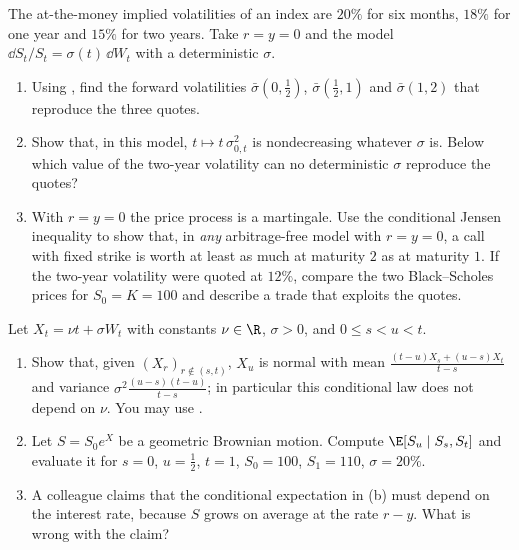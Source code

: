 
\begin{exercise}\label{ex:ps-forward-variance}
\easy The at-the-money implied volatilities of an index are $20\%$ for six months, $18\%$ for
one year and $15\%$ for two years. Take $r=y=0$ and the model
$\dd S_t/S_t=\sigma(t)\,\dd W_t$ with a deterministic $\sigma$.
\begin{enumerate}[label=(\alph*)]
  \item Using , find the forward volatilities
    $\bar\sigma(0,\frac12)$, $\bar\sigma(\frac12,1)$ and $\bar\sigma(1,2)$ that reproduce the
    three quotes.
  \item Show that, in this model, $t\mapsto t\,\sigma_{0,t}^2$ is nondecreasing whatever
    $\sigma$ is. Below which value of the two-year volatility can no deterministic $\sigma$
    reproduce the quotes?
  \item With $r=y=0$ the price process is a martingale. Use the conditional Jensen inequality
    to show that, in \emph{any} arbitrage-free model with $r=y=0$, a call with fixed strike is
    worth at least as much at maturity $2$ as at maturity $1$. If the two-year volatility were
    quoted at $12\%$, compare the two Black--Scholes prices for $S_0=K=100$ and describe a
    trade that exploits the quotes.
\end{enumerate}
\end{exercise}

\begin{exercise}\label{ex:ps-bridge-drift}
\easy Let $X_t=\nu t+\sigma W_t$ with constants $\nu\in\R$, $\sigma>0$, and $0\le s<u<t$.
\begin{enumerate}[label=(\alph*)]
  \item Show that, given $(X_r)_{r\notin(s,t)}$, $X_u$ is normal with mean
    $\frac{(t-u)X_s+(u-s)X_t}{t-s}$ and variance $\sigma^2\frac{(u-s)(t-u)}{t-s}$; in
    particular this conditional law does not depend on $\nu$. You may use
    .
  \item Let $S=S_0e^X$ be a geometric Brownian motion. Compute
    $\E[S_u\mid S_s,S_t]$ and evaluate it for $s=0$, $u=\frac12$, $t=1$, $S_0=100$,
    $S_1=110$, $\sigma=20\%$.
  \item A colleague claims that the conditional expectation in (b) must depend on the
    interest rate, because $S$ grows on average at the rate $r-y$. What is wrong with the
    claim?
\end{enumerate}
\end{exercise}

